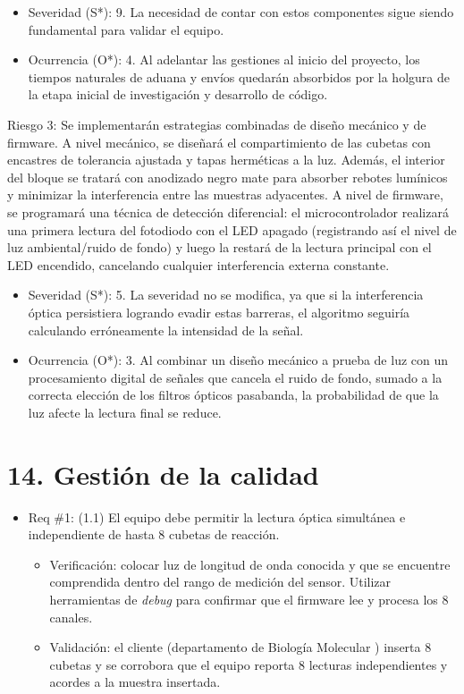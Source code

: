 \documentclass[
11pt, %
]{charter}
\begin{document}
\begin{itemize}
\item Severidad (S*): 9. La necesidad de contar con estos componentes sigue siendo fundamental para validar el equipo.

\item Ocurrencia (O*): 4. Al adelantar las gestiones al inicio del proyecto, los tiempos naturales de aduana y envíos quedarán absorbidos por la holgura de la etapa inicial de investigación y desarrollo de código.
\end{itemize}

Riesgo 3: Se implementarán estrategias combinadas de diseño mecánico y de firmware. A nivel mecánico, se diseñará el compartimiento de las cubetas con encastres de tolerancia ajustada y tapas herméticas a la luz. Además, el interior del bloque se tratará con anodizado negro mate para absorber rebotes lumínicos y minimizar la interferencia entre las muestras adyacentes. A nivel de firmware, se programará una técnica de detección diferencial: el microcontrolador realizará una primera lectura del fotodiodo con el LED apagado (registrando así el nivel de luz ambiental/ruido de fondo) y luego la restará de la lectura principal con el LED encendido, cancelando cualquier interferencia externa constante.

\begin{itemize}
\item Severidad (S*): 5. La severidad no se modifica, ya que si la interferencia óptica persistiera logrando evadir estas barreras, el algoritmo seguiría calculando erróneamente la intensidad de la señal.

\item Ocurrencia (O*): 3. Al combinar un diseño mecánico a prueba de luz con un procesamiento digital de señales que cancela el ruido de fondo, sumado a la correcta elección de los filtros ópticos pasabanda, la probabilidad de que la luz afecte la lectura final se reduce.
\end{itemize}


\section{14. Gestión de la calidad}
\label{sec:calidad}

\begin{itemize} 
\item Req \#1: (1.1) El equipo debe permitir la lectura óptica simultánea e independiente de hasta 8 cubetas de reacción.

\begin{itemize}
	\item Verificación: colocar luz de longitud de onda conocida y que se encuentre comprendida dentro del rango de medición del sensor. Utilizar herramientas de \textit{debug} para confirmar que el firmware lee y procesa los 8 canales.
	\item Validación: el cliente (departamento de Biología Molecular ) inserta 8 cubetas y se corrobora que el equipo reporta 8 lecturas independientes y acordes a la muestra insertada. 
\end{itemize}

\end{itemize}
\end{document}
